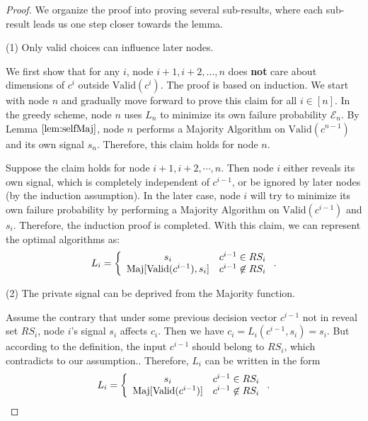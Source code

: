 \documentclass[a4paper,UKenglish]{lipics}
\theoremstyle{definition}
\newcommand{\Maj}{\text{Maj}}
\begin{document}
\begin{proof}
We organize the proof into proving several sub-results,
	where each sub-result leads us one  step closer towards the lemma.

(1) Only valid choices can influence later nodes.

We first show that for any $i$, node $i+1, i+2, \dots, n$ does \textbf{not} care about dimensions of $c^{i}$ outside $\text{Valid}(c^{i})$.
The proof is based on induction. 
We start with node $n$ and gradually move forward to prove this claim for all $i\in [n]$.
In the greedy scheme, node $n$ uses $L_n$ to minimize its own failure probability $\mathcal{E}_n$.
By Lemma $\ref{lem:selfMaj}$, node $n$ performs a Majority Algorithm on $\text{Valid}(c^{n-1})$ and its own signal $s_n$. 
Therefore, this claim holds for node $n$.

Suppose the claim holds for node $i+1, i+2,\dotsb, n$.
Then node $i$ either reveals its own signal, which is completely independent of $c^{i-1}$, or be ignored by later nodes (by the induction assumption). 
In the later case, node $i$ will try to minimize its own failure probability by performing a Majority Algorithm on $\text{Valid}(c^{i-1})$ and $s_i$.
Therefore, the induction proof is completed.
With this claim, we can represent the optimal algorithms as:
\begin{equation*}
L_i 
= \left\{ 
	\begin{array}{c l}
		s_i & c^{i-1} \in RS_i \\
 		\Maj[\text{Valid}(c^{i-1}), s_i] & c^{i-1} \not\in RS_i
 	\end{array}
	\right..
\end{equation*}

(2) The private signal can be deprived from the Majority function.

Assume the contrary that under some previous decision vector $c^{i-1}$ not in reveal set $RS_i$, node $i$'s signal $s_i$ affects $c_i$. 
Then we have $c_i = L_i(c^{i-1},s_i) = s_i$.
But according to the definition, the input $c^{i-1}$ should belong to $RS_i$, which contradicts to our assumption..
Therefore, $L_i$ can be written in the form
\begin{equation*}
L_i 
= \left\{ 
	\begin{array}{c l}
		s_i & c^{i-1} \in RS_i \\
 		\Maj[\text{Valid}(c^{i-1})] & c^{i-1} \not\in RS_i
 	\end{array}
	\right..
\end{equation*}


\end{proof}
\end{document}
